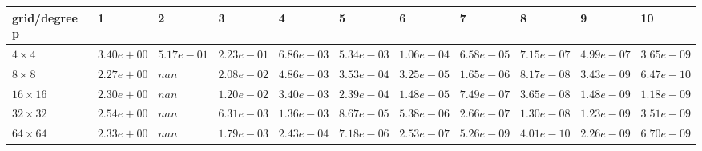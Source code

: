 \begin{tabular}{lllllllllll}
\hline
 grid/degree p   & 1          & 2          & 3          & 4          & 5          & 6          & 7          & 8          & 9          & 10         \\
\hline
 $4 \times 4$    & $3.40e+00$ & $5.17e-01$ & $2.23e-01$ & $6.86e-03$ & $5.34e-03$ & $1.06e-04$ & $6.58e-05$ & $7.15e-07$ & $4.99e-07$ & $3.65e-09$ \\
 $8 \times 8$    & $2.27e+00$ & $nan$      & $2.08e-02$ & $4.86e-03$ & $3.53e-04$ & $3.25e-05$ & $1.65e-06$ & $8.17e-08$ & $3.43e-09$ & $6.47e-10$ \\
 $16 \times 16$  & $2.30e+00$ & $nan$      & $1.20e-02$ & $3.40e-03$ & $2.39e-04$ & $1.48e-05$ & $7.49e-07$ & $3.65e-08$ & $1.48e-09$ & $1.18e-09$ \\
 $32 \times 32$  & $2.54e+00$ & $nan$      & $6.31e-03$ & $1.36e-03$ & $8.67e-05$ & $5.38e-06$ & $2.66e-07$ & $1.30e-08$ & $1.23e-09$ & $3.51e-09$ \\
 $64 \times 64$  & $2.33e+00$ & $nan$      & $1.79e-03$ & $2.43e-04$ & $7.18e-06$ & $2.53e-07$ & $5.26e-09$ & $4.01e-10$ & $2.26e-09$ & $6.70e-09$ \\
\hline
\end{tabular}